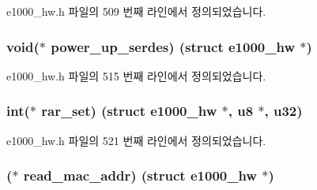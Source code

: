 e1000\+\_\+hw.\+h 파일의 509 번째 라인에서 정의되었습니다.

\subsubsection[{\texorpdfstring{power\+\_\+up\+\_\+serdes}{power_up_serdes}}]{\setlength{\rightskip}{0pt plus 5cm}void($\ast$ power\+\_\+up\+\_\+serdes) (struct {\bf e1000\+\_\+hw} $\ast$)}\hypertarget{structe1000__mac__operations_a5e5165d542192868c5b17d04d7795097}{}\label{structe1000__mac__operations_a5e5165d542192868c5b17d04d7795097}


e1000\+\_\+hw.\+h 파일의 515 번째 라인에서 정의되었습니다.

\subsubsection[{\texorpdfstring{rar\+\_\+set}{rar_set}}]{\setlength{\rightskip}{0pt plus 5cm}int($\ast$ rar\+\_\+set) (struct {\bf e1000\+\_\+hw} $\ast$, {\bf u8} $\ast$, {\bf u32})}\hypertarget{structe1000__mac__operations_ac0fac38c1232e4192044e2fab6e22328}{}\label{structe1000__mac__operations_ac0fac38c1232e4192044e2fab6e22328}


e1000\+\_\+hw.\+h 파일의 521 번째 라인에서 정의되었습니다.

\subsubsection[{\texorpdfstring{read\+\_\+mac\+\_\+addr}{read_mac_addr}}]{($\ast$ read\+\_\+mac\+\_\+addr) (struct {\bf e1000\+\_\+hw} $\ast$)}\hypertarget{structe1000__mac__operations_aa8f91b018b0fa23b244f5940da324a16}{}\label{structe1000__mac__operations_aa8f91b018b0fa23b244f5940da324a16}


